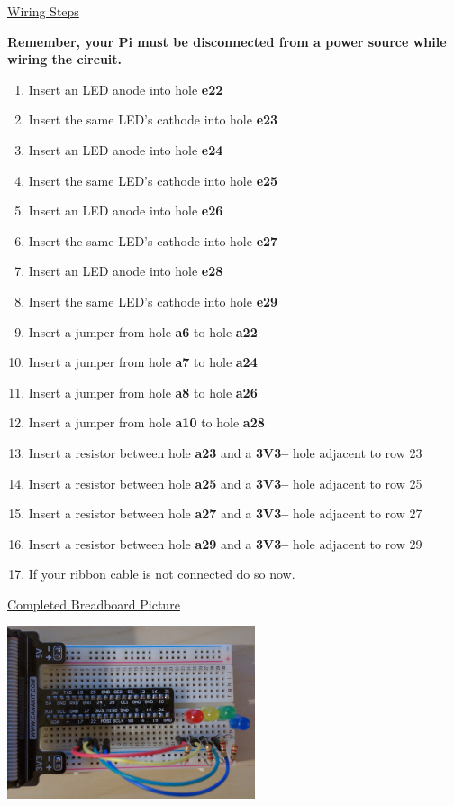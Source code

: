 \underline{Wiring Steps}

\textbf{Remember, your Pi must be disconnected from a power source while wiring the circuit.}

\begin{enumerate}
	\item Insert an LED anode into hole \textbf{e22}
	\item Insert the same LED's cathode into hole \textbf{e23}
	\item Insert an LED anode into hole \textbf{e24}
	\item Insert the same LED's cathode into hole \textbf{e25}
	\item Insert an LED anode into hole \textbf{e26}
	\item Insert the same LED's cathode into hole \textbf{e27}
	\item Insert an LED anode into hole \textbf{e28}
	\item Insert the same LED's cathode into hole \textbf{e29}

	\item Insert a jumper from hole \textbf{a6} to hole \textbf{a22}
	\item Insert a jumper from hole \textbf{a7} to hole \textbf{a24}
	\item Insert a jumper from hole \textbf{a8} to hole \textbf{a26}
	\item Insert a jumper from hole \textbf{a10} to hole \textbf{a28}

	\item Insert a resistor between hole \textbf{a23} and a \textbf{3V3--} hole adjacent to row 23
	\item Insert a resistor between hole \textbf{a25} and a \textbf{3V3--} hole adjacent to row 25
	\item Insert a resistor between hole \textbf{a27} and a \textbf{3V3--} hole adjacent to row 27
	\item Insert a resistor between hole \textbf{a29} and a \textbf{3V3--} hole adjacent to row 29
	
	\item If your ribbon cable is not connected do so now.
\end{enumerate}

\underline{Completed Breadboard Picture}

\beforefig
\centerline{\includegraphics[height=2in]{pi_images/lab02images/PiLab02-4Light-photo.jpg}}
\afterfig

